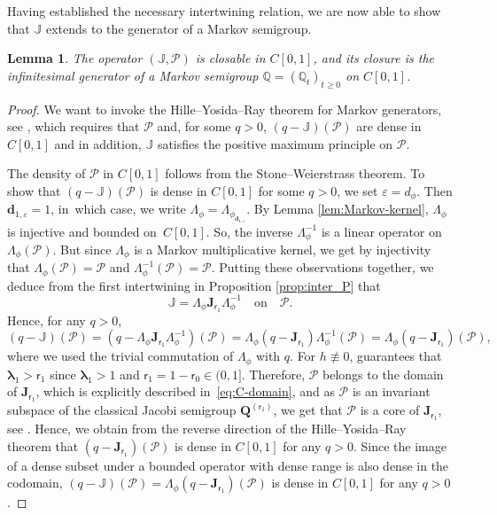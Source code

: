 \documentclass[JEP,XML,SOM,Unicode]{cedram}
\let\epsilon\varepsilon
\theoremstyle{plain}
\newtheorem{lemma}[theorem]{Lemma}
\theoremstyle{definition}
\newcommand{\Poly}{\mathscr{P}}
\newcommand{\J}{\mathds{Q}}
\newcommand{\calJ}{\mathds{J}}
\newcommand{\calJd}{\mathbf{J}}
\newcommand{\dz}{{\bm{d}}_{1,\epsilon}}
\newcommand{\lam}{{\bm{\lambda}_1}}
\newcommand{\tet}{{\mathsf{r}_0}}
\newcommand{\vat}{{\mathsf{r}_1}}
\newcommand{\Q}[1][\mo]{\mathbf{Q}^{({#1})}}
\let\mo\mu
\begin{document}
Having established the necessary intertwining relation, we are now able to show that $\calJ$ extends to the generator of a Markov semigroup.

\begin{lemma}
\label{lem:feller}
The operator $(\calJ ,\Poly)$ is closable in $C[0,1]$, and its closure is the infinitesimal generator of a Markov semigroup $\J = (\J_t)_{t \geq 0}$ on $C[0,1]$.
\end{lemma}

\begin{proof}
We want to invoke the Hille--Yosida--Ray theorem for Markov generators, see \cite[Th.\,1.30]{Levy-Matters-III}, which requires that $\Poly$ and, for some $q>0$, $(q-\calJ)(\Poly)$ are dense in $C[0,1]$ and in addition, $\calJ$ satisfies the positive maximum principle on $\Poly$.

The density of $\Poly$ in $C[0,1]$ follows from the Stone--Weierstrass theorem.
To show that $(q-\calJ)(\Poly)$ is dense in $C[0,1]$ for some $q >0$, we set $\epsilon = d_\phi$. Then
$\dz = 1$, in~which case, we write $\Lambda_{\phi} = \Lambda_{\phi_{\dz}}$.
By Lemma \ref{lem:Markov-kernel}, $\Lambda_{\phi}$ is injective and bounded on~$C[0,1]$. So, the inverse $\Lambda_{\phi}^{-1}$ is a linear operator on $\Lambda_{\phi}(\Poly)$. But since $\Lambda_\phi$ is a Markov multiplicative kernel, we get by injectivity that $\Lambda_\phi(\Poly) = \Poly$ and $\Lambda_\phi^{-1}(\Poly) = \Poly$.
Putting these observations together, we deduce from the first intertwining in Proposition \ref{prop:inter_P} that\vspace*{-3pt}
\begin{equation*}
\calJ =\Lambda_{\phi}\calJd_{\vat} \Lambda_{\phi}^{-1} \quad \text{on} \quad \Poly.
\end{equation*}
Hence, for any $q >0$,\vspace*{-3pt}
\begin{equation*}
(q - \calJ)(\Poly) = (q - \Lambda_\phi \calJd_{\vat} \Lambda_\phi^{-1})(\Poly) = \Lambda_\phi(q-\calJd_{\vat})\Lambda_\phi^{-1}(\Poly) = \Lambda_\phi(q-\calJd_{\vat})(\Poly),
\end{equation*}
where we used the trivial commutation of $\Lambda_\phi$ with $q$. For $h \not\equiv 0$,  guarantees that $\lam > \vat$ since $\lam > 1$ and $\vat = 1-\tet \in (0,1]$. Therefore, $\Poly$ belongs to the domain of $\calJd_{\vat}$, which is explicitly described in~\eqref{eq:C-domain}, and as $\Poly$ is an invariant subspace of the classical Jacobi semigroup $\Q[\vat]$, we get that $\Poly$ is a core of $\calJd_{\vat}$, see \cite[Lem.\,1.34]{Levy-Matters-III}. Hence, we obtain from the
reverse direction of the Hille--Yosida--Ray theorem that $(q-\calJd_{\vat})(\Poly)$ is dense in $C[0,1]$ for any $q > 0$. Since the image of a dense subset under a bounded operator with dense range is also dense in the codomain,
$(q - \calJ)(\Poly) = \Lambda_\phi(q-\calJd_{\vat})(\Poly)$ is dense in $C[0,1]$ for any $q > 0$.


\end{proof}
\end{document}
